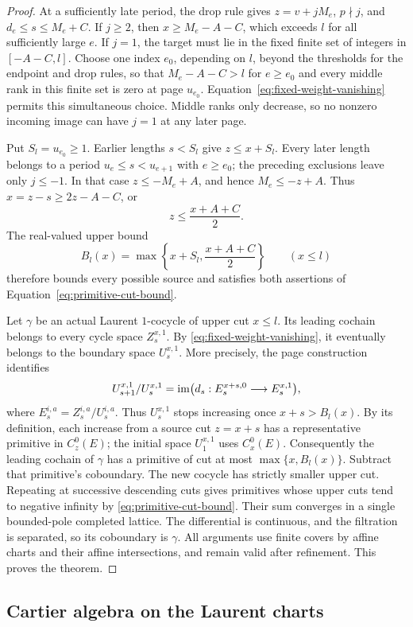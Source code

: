 \begin{proof}
At a sufficiently late period, the drop rule gives
$z=v+jM_e$, $p\nmid j$, and $d_e\le s\le M_e+C$.
If $j\ge2$, then $x\ge M_e-A-C$, which exceeds $l$ for
all sufficiently large $e$.  If $j=1$, the target must lie in
the fixed finite set of integers in $[-A-C,l]$.
Choose one index $e_0$, depending on $l$, beyond the thresholds
for the endpoint and drop rules, so that $M_e-A-C>l$ for
$e\ge e_0$ and every middle rank in this finite set is zero at
page $u_{e_0}$.  Equation~\eqref{eq:fixed-weight-vanishing}
permits this simultaneous choice.  Middle ranks only decrease,
so no nonzero incoming image can have $j=1$ at any later page.

Put $S_l=u_{e_0}\ge1$.  Earlier lengths $s<S_l$ give
$z\le x+S_l$.  Every later length belongs to a period
$u_e\le s<u_{e+1}$ with $e\ge e_0$; the preceding exclusions
leave only $j\le-1$.  In that case $z\le-M_e+A$, and hence
$M_e\le-z+A$.  Thus $x=z-s\ge2z-A-C$, or
\[
 z\le\frac{x+A+C}{2}.
\]
The real-valued upper bound
\[
 B_l(x)=\max\left\{x+S_l,\frac{x+A+C}{2}\right\}
 \qquad(x\le l)
\]
therefore bounds every possible source and satisfies both assertions
of Equation~\eqref{eq:primitive-cut-bound}.

Let $\gamma$ be an actual Laurent $1$-cocycle of upper cut $x\le l$.
Its leading cochain belongs to every cycle space $Z_s^{x,1}$.
By \eqref{eq:fixed-weight-vanishing}, it eventually belongs to the
boundary space $U_s^{x,1}$.  More precisely, the page construction
identifies
\[
 U_{s+1}^{x,1}/U_s^{x,1}
 =\operatorname{im}\bigl(d_s:E_s^{x+s,0}\longrightarrow E_s^{x,1}\bigr),
\]
where $E_s^{i,a}=Z_s^{i,a}/U_s^{i,a}$.
Thus $U_s^{x,1}$ stops increasing once $x+s>B_l(x)$.
By its definition, each increase from a source cut $z=x+s$
has a representative primitive in $C_z^0(E)$; the initial space
$U_1^{x,1}$ uses $C_x^0(E)$.
Consequently the leading cochain of $\gamma$ has a primitive of
cut at most $\max\{x,B_l(x)\}$.
Subtract that primitive's coboundary.  The new cocycle has strictly
smaller upper cut.  Repeating at successive descending cuts gives
primitives whose upper cuts tend to negative infinity by
\eqref{eq:primitive-cut-bound}.  Their sum converges in a single
bounded-pole completed lattice.  The differential is continuous,
and the filtration is separated, so its coboundary is $\gamma$.
All arguments use finite covers by affine charts and their affine
intersections, and remain valid after refinement.  This proves the
theorem.
\end{proof}

\subsection{Cartier algebra on the Laurent charts}

